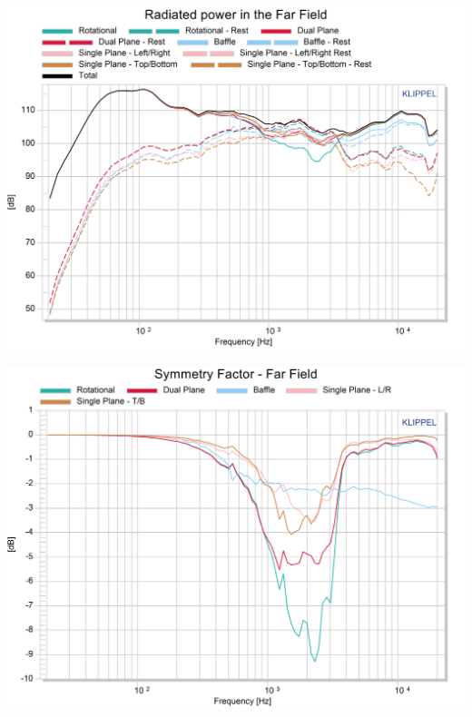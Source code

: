 \documentclass{report}
\begin{document}
\begin{minipage}{0.5\textwidth}
\begin{center}
	\includegraphics[width=\textwidth]{Sym/Rad_Pow_BnO} 
    \captionsetup{hypcap=false} 
	\label{fig:rad_pow_BnO}
\end{center}
\end{minipage}
\begin{minipage}{0.5\textwidth}
\begin{center}
	\includegraphics[width=\textwidth]{Sym/Sym_Fact_BnO} 
    \captionsetup{hypcap=false} 
	\label{fig:sym_fact_BnO}
\end{center}
\end{minipage}
\end{document}

